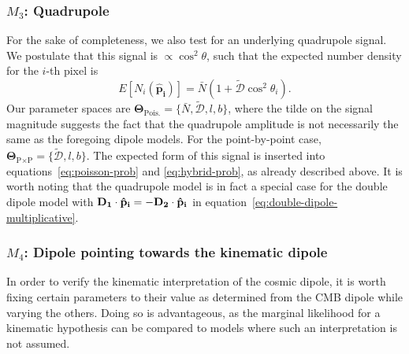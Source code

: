 \documentclass[fleqn,usenatbib]{mnras}
\begin{document}
    \subsubsection{$M_3$: Quadrupole}
        For the sake of completeness, we also test for an underlying quadrupole signal. We postulate that this signal is $\propto \cos^2 \theta$, such that the expected number density for the $i$-th pixel is
        \begin{equation}
            E[N_i (\mathbf{\hat{p}_i}) ] = \bar{N} (1 + \mathcal{\tilde{D}} \cos^2 \theta_i).\label{eq:quadrupole-expectation}
        \end{equation}
        Our parameter spaces are $\mathbf{\Theta}_{\text{Pois}.} = \{ \bar{N}, \mathcal{\tilde{D}}, l, b \}$, where the tilde on the signal magnitude suggests the fact that the quadrupole amplitude is not necessarily the same as the foregoing dipole models. For the point-by-point case, $\mathbf{\Theta}_{\text{P}\times\text{P}} = \{ \mathcal{\tilde{D}}, l, b \}$. 
        The expected form of this signal is inserted into equations~\eqref{eq:poisson-prob} and \eqref{eq:hybrid-prob}, as already described above. 
        It is worth noting that the quadrupole model is in fact a special case for the double dipole model with $\mathcal{\bf D_{1}}\cdot {\bf \hat{p}_{i}} = -\mathcal{\bf D_{2}}\cdot {\bf \hat{p}_{i}}$ in equation~\eqref{eq:double-dipole-multiplicative}. 
        
        
    \subsubsection{$M_4$: Dipole pointing towards the kinematic dipole}
        \label{subs:amplitude}
        In order to verify the kinematic interpretation of the cosmic dipole, it is worth fixing certain parameters to their value as determined from the CMB dipole while varying the others.
        Doing so is advantageous, as the marginal likelihood for a kinematic hypothesis can be compared to models where such an interpretation is not assumed.
        
\end{document}
